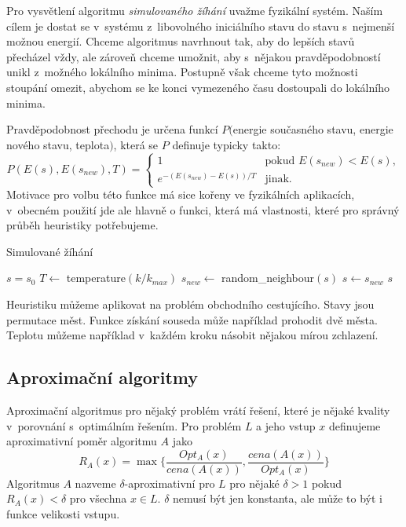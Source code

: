 Pro vysvětlení algoritmu {\em simulovaného žíhání} uvažme fyzikální
systém. Naším cílem je dostat se v~systému z~libovolného iniciálního
stavu do stavu s~nejmenší možnou energií. Chceme algoritmus navrhnout
tak, aby do lepších stavů přecházel vždy, ale zároveň chceme umožnit,
aby s~nějakou pravděpodobností unikl z~možného lokálního minima.
Postupně však chceme tyto možnosti stoupání omezit, abychom
se ke konci vymezeného času dostoupali do lokálního minima.

Pravděpodobnost přechodu je určena funkcí $P($energie současného stavu,
energie nového stavu, teplota$)$, která se $P$ definuje typicky takto:
\[
    P(E(s), E(s_{new}), T) =
    \begin{cases}
        1 & \text{pokud } E(s_{new}) < E(s), \\
        e^{-(E(s_{new}) - E(s)) / T} & \text{jinak.}
    \end{cases}
\]
Motivace pro volbu této funkce má sice kořeny ve fyzikálních aplikacích,
v~obecném použití jde ale hlavně o funkci, která má vlastnosti, které
pro správný průběh heuristiky potřebujeme.

\begin{algorithm}
\caption{Simulované žíhání}
\begin{algorithmic}[1]
    \State $s = s_0$
        \State $T \gets $ temperature$(k / k_{max})$
        \State $s_{new} \gets $ random\_neighbour$(s)$
            \State $s \gets s_{new}$
        \EndIf
    \EndFor
    \State \Return $s$
\EndFunction
\end{algorithmic}
\end{algorithm}

Heuristiku můžeme aplikovat na problém obchodního cestujícího. Stavy
jsou permutace měst. Funkce získání souseda může například prohodit
dvě města. Teplotu můžeme například v~každém kroku násobit nějakou mírou
zchlazení.

\subsection{Aproximační algoritmy}

Aproximační algoritmus pro nějaký problém vrátí řešení, které je nějaké
kvality v~porovnání s~optimálním řešením.
Pro problém $L$ a jeho vstup $x$ definujeme aproximativní poměr
algoritmu $A$ jako
\[
    R_A(x) = \max \big \{ \frac{Opt_A(x)}{cena(A(x))},
    \frac{cena(A(x))}{Opt_A(x)} \big \}
\]
Algoritmus $A$ nazveme $\delta$-aproximativní pro $L$ pro
nějaké $\delta > 1$ pokud $R_A(x) < \delta$ pro všechna $x \in L$.
$\delta$ nemusí být jen konstanta, ale může to být i funkce velikosti
vstupu.

